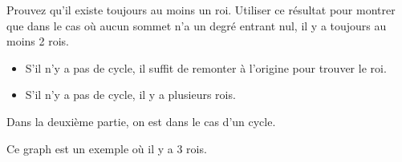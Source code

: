 Prouvez qu'il existe toujours au moins un roi.
Utiliser ce résultat pour montrer que dans le cas où aucun sommet n'a un degré entrant nul, il y a toujours au moins 2 rois.
\begin{solution}
\begin{itemize}
\item S'il n'y a pas de cycle, il suffit de remonter à l'origine pour trouver le roi.
\item S'il n'y a pas de cycle, il y a plusieurs rois.
\end{itemize}

Dans la deuxième partie, on est dans le cas d'un cycle.

Ce graph est un exemple où il y a 3 rois.

\end{solution}
